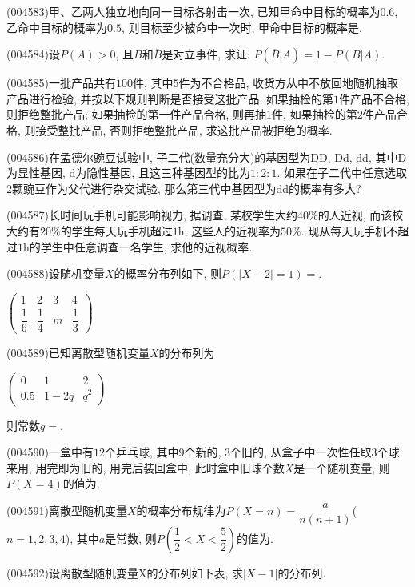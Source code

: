 \item (004583)甲、乙两人独立地向同一目标各射击一次, 已知甲命中目标的概率为$0.6$, 乙命中目标的概率为$0.5$, 则目标至少被命中一次时, 甲命中目标的概率是.
\item (004584)设$P(A)>0$, 且$B$和$\overline B$是对立事件, 求证: $P(\overline B|A)=1-P(B|A)$.
\item (004585)一批产品共有$100$件, 其中$5$件为不合格品, 收货方从中不放回地随机抽取产品进行检验, 并按以下规则判断是否接受这批产品; 如果抽检的第$1$件产品不合格, 则拒绝整批产品; 如果抽检的第一件产品合格, 则再抽$1$件, 如果抽检的第$2$件产品合格, 则接受整批产品, 否则拒绝整批产品, 求这批产品被拒绝的概率.
\item (004586)在孟德尔豌豆试验中, 子二代(数量充分大)的基因型为DD, Dd, dd, 其中D为显性基因, d为隐性基因, 且这三种基因型的比为$1: 2: 1$. 如果在子二代中任意选取$2$颗豌豆作为父代进行杂交试验, 那么第三代中基因型为dd的概率有多大?
\item (004587)长时间玩手机可能影响视力, 据调查, 某校学生大约$40\%$的人近视, 而该校大约有$20\%$的学生每天玩手机超过$1\text{h}$, 这些人的近视率为$50\%$. 现从每天玩手机不超过$1\text{h}$的学生中任意调查一名学生, 求他的近视概率.
\item (004588)设随机变量$X$的概率分布列如下, 则$P(|X-2|=1)=$.
\begin{center}
    $\begin{pmatrix}
        1 & 2 & 3 & 4\\ 
        \dfrac 16 & \dfrac 14 & m & \dfrac 13      
    \end{pmatrix}$
\end{center}
\item (004589)已知离散型随机变量$X$的分布列为
\begin{center}
    $\begin{pmatrix}
        0 & 1 & 2 \\ 
        0.5 & 1-2q & q^2 
    \end{pmatrix}$
\end{center}
则常数$q=$.
\item (004590)一盒中有$12$个乒乓球, 其中$9$个新的, $3$个旧的, 从盒子中一次性任取$3$个球来用, 用完即为旧的, 用完后装回盒中, 此时盒中旧球个数$X$是一个随机变量, 则$P(X=4)$的值为.
\item (004591)离散型随机变量$X$的概率分布规律为$P(X=n)=\dfrac{a}{n(n+1)}$($n=1, 2, 3, 4$), 其中$a$是常数, 则$P(\dfrac 12<X<\dfrac 52)$的值为.
\item (004592)设离散型随机变量X的分布列如下表, 求$|X-1|$的分布列.
